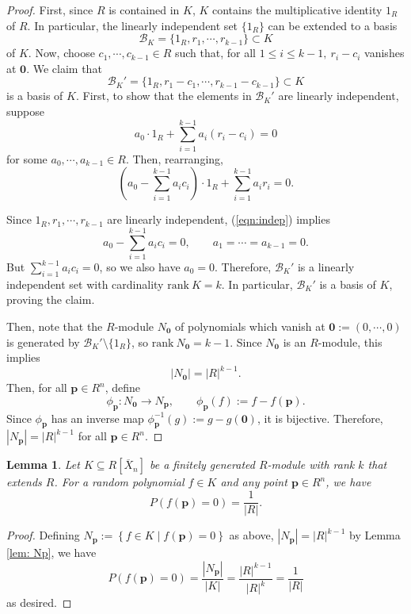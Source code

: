 \documentclass[12pt]{amsart}
\newtheorem{lemma}[theorem]{Lemma}
\theoremstyle{definition}
\newcommand{\bp}{\mathbf{p} }
\begin{document}
\begin{proof}
First, since $R$ is contained in $K$, $K$ contains the multiplicative identity $1_R$ of $R$. In particular, the linearly independent set $\{1_R\}$ can be extended to a basis
\[
\mathcal{B}_K = \{ 1_R, r_1, \cdots , r_{k-1} \} \subset K
\]
of $K$. Now, choose $c_1, \cdots , c_{k-1} \in R$ such that, for all $1 \le i \le k-1, \ r_i - c_i$ vanishes at $\mathbf{0}$. We claim that
\[
\mathcal{B}_K' = \{ 1_R, r_1-c_1, \cdots , r_{k-1}-c_{k-1} \} \subset K
\]
is a basis of $K$. First, to show that the elements in $\mathcal{B}_K'$ are linearly independent, suppose 
\[
a_0 \cdot 1_R + \sum_{i=1}^{k-1}a_i(r_i - c_i) = 0
\]
for some $a_0, \cdots , a_{k-1} \in R$. Then, rearranging,
\begin{equation}\label{eqn:indep}
\left( a_0 -\sum_{i=1}^{k-1}a_ic_i \right) \cdot 1_R + \sum_{i=1}^{k-1}a_ir_i = 0.
\end{equation}

Since $1_R, r_1, \cdots, r_{k-1}$ are linearly independent, (\ref{eqn:indep}) implies
\[
a_0 -\sum_{i=1}^{k-1}a_ic_i = 0, \qquad a_1= \cdots = a_{k-1} = 0.
\]
But $\sum_{i=1}^{k-1}a_ic_i = 0$, so we also have $a_0 = 0$. Therefore, $\mathcal{B}_K'$ is a linearly independent set with cardinality $\mathrm{rank} \ K = k$. In particular, $\mathcal{B}_K'$ is a basis of $K$, proving the claim.

Then, note that the $R$-module $N_{\mathbf{0}}$ of polynomials which vanish at $\mathbf{0} := (0, \cdots , 0)$ is generated by $\mathcal{B}_K' \setminus \{1_R \}$, so $\mathrm{rank} \ N_{\mathbf{0}} = k-1$. Since $N_{\mathbf{0}}$ is an $R$-module, this implies
\[
|N_{\mathbf{0}}| = |R|^{k-1}.
\]
Then, for all $\bp \in R^n$, define 
\[
\phi_\bp: N_{\mathbf{0}} \to N_\bp, \qquad \phi_\bp(f) := f - f(\bp).
\]
Since $\phi_\bp$ has an inverse map
$\phi^{-1}_\bp(g) := g - g(\mathbf{0})$, it is bijective. Therefore, $|N_\bp| = |R|^{k - 1}$ for all $\bp \in R^n$.
\end{proof}

\begin{lemma}\label{lem: ringvanishingprob}
Let $K \subseteq R[\overline{X}_n]$ be a finitely generated $R$-module with rank $k$ that extends $R$. For a random polynomial $f \in K$ and any point $\bp \in R^n$, we have
\[
P(f(\bp) = 0) = \frac{1}{|R|}.
\]
\end{lemma}

\begin{proof}
Defining $N_\bp := \left\{ f \in K \mid f(\bp) = 0 \right\}$ as above, $|N_{\mathbf{\bp}}| = |R|^{k-1}$  by Lemma \ref{lem: Np}, we have
\[
P(f(\bp) = 0) = \frac{|N_\bp|}{|K|} = \frac{|R|^{k - 1}}{|R|^{k}} = \frac{1}{|R|}
\] 
as desired.
\end{proof}
\end{document}
